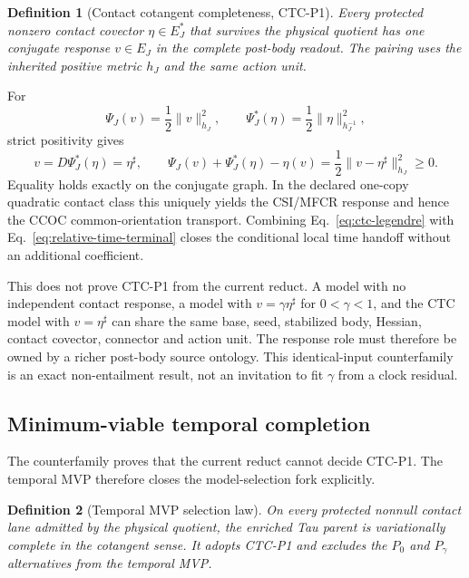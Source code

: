 \documentclass[11pt]{article}
\newtheorem{definition}{Definition}
\begin{document}
\begin{definition}[Contact cotangent completeness, CTC-P1]
Every protected nonzero contact covector $\eta\in E_J^*$ that survives the
physical quotient has one conjugate response $v\in E_J$ in the complete
post-body readout. The pairing uses the inherited positive metric $h_J$ and
the same action unit.
\end{definition}

For
\begin{equation}
 \Psi_J(v)=\frac12\|v\|_{h_J}^2,
 \qquad
 \Psi_J^*(\eta)=\frac12\|\eta\|_{h_J^{-1}}^2,
\end{equation}
strict positivity gives
\begin{equation}
 v=D\Psi_J^*(\eta)=\eta^\sharp,
 \qquad
 \Psi_J(v)+\Psi_J^*(\eta)-\eta(v)
 =\frac12\|v-\eta^\sharp\|_{h_J}^2\ge0.
 \label{eq:ctc-legendre}
\end{equation}
Equality holds exactly on the conjugate graph. In the declared one-copy
quadratic contact class this uniquely yields the CSI/MFCR response and hence
the CCOC common-orientation transport. Combining
Eq.~\eqref{eq:ctc-legendre} with
Eq.~\eqref{eq:relative-time-terminal} closes the conditional local time
handoff without an additional coefficient.

This does not prove CTC-P1 from the current reduct. A model with no independent
contact response, a model with $v=\gamma\eta^\sharp$ for $0<\gamma<1$, and the
CTC model with $v=\eta^\sharp$ can share the same base, seed, stabilized body,
Hessian, contact covector, connector and action unit. The response role must
therefore be owned by a richer post-body source ontology. This identical-input
counterfamily is an exact non-entailment result, not an invitation to fit
$\gamma$ from a clock residual.

\subsection{Minimum-viable temporal completion}

The counterfamily proves that the current reduct cannot decide CTC-P1. The
temporal MVP therefore closes the model-selection fork explicitly.

\begin{definition}[Temporal MVP selection law]
On every protected nonnull contact lane admitted by the physical quotient, the
enriched Tau parent is variationally complete in the cotangent sense. It adopts
CTC-P1 and excludes the $P_0$ and $P_\gamma$ alternatives from the temporal
MVP.
\end{definition}
\end{document}
